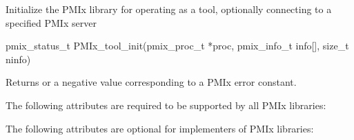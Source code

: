 \summary

Initialize the \ac{PMIx} library for operating as a tool, optionally connecting to a specified \ac{PMIx} server

\format

\cspecificstart
\begin{codepar}
pmix_status_t
PMIx_tool_init(pmix_proc_t *proc,
               pmix_info_t info[], size_t ninfo)
\end{codepar}
\cspecificend

\begin{arglist}
\end{arglist}

Returns  or a negative value corresponding to a PMIx error constant.

\reqattrstart
The following attributes are required to be supported by all \ac{PMIx} libraries:


\reqattrend

\optattrstart
The following attributes are optional for implementers of \ac{PMIx} libraries:

